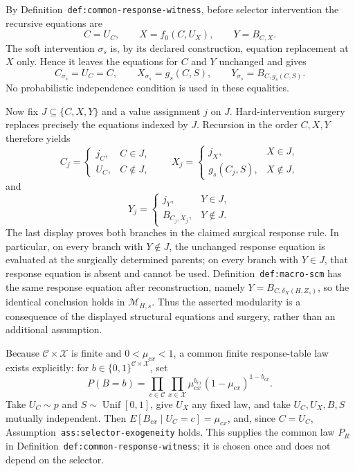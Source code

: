 By Definition~\texttt{def:common-response-witness}, before selector intervention the recursive equations are
\[
C=U_C,\qquad X=f_0(C,U_X),\qquad Y=B_{C,X}.
\]
The soft intervention \(\sigma_s\) is, by its declared construction, equation replacement at \(X\) only.  Hence it leaves the equations for \(C\) and \(Y\) unchanged and gives
\[
C_{\sigma_s}=U_C=C,\qquad X_{\sigma_s}=g_s(C,S),\qquad
Y_{\sigma_s}=B_{C,g_s(C,S)}.
\]
No probabilistic independence condition is used in these equalities.

Now fix \(J\subseteq\{C,X,Y\}\) and a value assignment \(j\) on \(J\).  Hard-intervention surgery replaces precisely the equations indexed by \(J\).  Recursion in the order \(C,X,Y\) therefore yields
\[
C_j=\begin{cases}j_C,&C\in J,\\ U_C,&C\notin J,\end{cases}
\qquad
X_j=\begin{cases}j_X,&X\in J,\\ g_s(C_j,S),&X\notin J,\end{cases}
\]
and
\[
Y_j=\begin{cases}j_Y,&Y\in J,\\ B_{C_j,X_j},&Y\notin J.\end{cases}
\]
The last display proves both branches in the claimed surgical response rule.  In particular, on every branch with \(Y\notin J\), the unchanged response equation is evaluated at the surgically determined parents; on every branch with \(Y\in J\), that response equation is absent and cannot be used.  Definition~\texttt{def:macro-scm} has the same response equation after reconstruction, namely \(Y=B_{C,\delta_X(H,Z_s)}\), so the identical conclusion holds in \(\mathcal M_{H,s}\).  Thus the asserted modularity is a consequence of the displayed structural equations and surgery, rather than an additional assumption.

Because \(\mathcal C\times\mathcal X\) is finite and \(0<\mu_{cx}<1\), a common finite response-table law exists explicitly: for \(b\in\{0,1\}^{\mathcal C\times\mathcal X}\), set
\[
P(B=b)=\prod_{c\in\mathcal C}\prod_{x\in\mathcal X}
\mu_{cx}^{b_{cx}}(1-\mu_{cx})^{1-b_{cx}}.
\]
Take \(U_C\sim p\) and \(S\sim\operatorname{Unif}[0,1]\), give \(U_X\) any fixed law, and take \(U_C,U_X,B,S\) mutually independent.  Then \(E[B_{cx}\mid U_C=c]=\mu_{cx}\), and, since \(C=U_C\), Assumption~\texttt{ass:selector-exogeneity} holds.  This supplies the common law \(P_R\) in Definition~\texttt{def:common-response-witness}; it is chosen once and does not depend on the selector.

